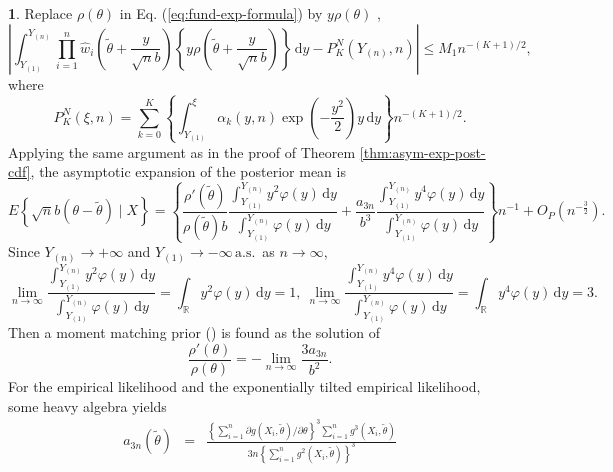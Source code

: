 \documentclass[oneside,english]{amsbook}
\numberwithin{section}{chapter}
\numberwithin{equation}{section}
\numberwithin{figure}{section}
\theoremstyle{plain}
\theoremstyle{plain}
\theoremstyle{definition}
\theoremstyle{plain}
\theoremstyle{plain}
\theoremstyle{remark}
\theoremstyle{definition}
\newtheorem{example}{\protect\examplename}
\theoremstyle{definition}
\newcommand{\diff}{\,\mathrm{d}}
\newcommand{\ascv}{\,\mathrm{a.s.}\,}
\providecommand{\examplename}{Example}
\begin{document}
\begin{example}
Replace $\rho\left(\theta\right)$ in Eq. (\ref{eq:fund-exp-formula})
by $y\rho\left(\theta\right)$ , 
\[
\left|\int_{Y_{\left(1\right)}}^{Y_{\left(n\right)}}\prod_{i=1}^{n}\hat{w}_{i}\left(\tilde{\theta}+\frac{y}{\sqrt{n}b}\right)\left\{ y\rho\left(\tilde{\theta}+\frac{y}{\sqrt{n}b}\right)\right\} \diff y-P_{K}^{N}\left(Y_{\left(n\right)},n\right)\right|\le M_{1}n^{-\left(K+1\right)/2},
\]
where 
\[
P_{K}^{N}\left(\xi,n\right)=\sum_{k=0}^{K}\left\{ \int_{Y_{\left(1\right)}}^{\xi}\alpha_{k}\left(y,n\right)\exp\left(-\frac{y^{2}}{2}\right)y\diff y\right\} n^{-\left(K+1\right)/2}.
\]
Applying the same argument as in the proof of Theorem \ref{thm:asym-exp-post-cdf},
the asymptotic expansion of the posterior mean is 
\[
E\left\{ \sqrt{n}b\left(\theta-\tilde{\theta}\right)\mid X\right\} =\left\{ \frac{\rho'\left(\tilde{\theta}\right)}{\rho\left(\tilde{\theta}\right)b}\frac{\int_{Y_{\left(1\right)}}^{Y_{\left(n\right)}}y^{2}\varphi\left(y\right)\diff y}{\int_{Y_{\left(1\right)}}^{Y_{\left(n\right)}}\varphi\left(y\right)\diff y}+\frac{a_{3n}}{b^{3}}\frac{\int_{Y_{\left(1\right)}}^{Y_{\left(n\right)}}y^{4}\varphi\left(y\right)\diff y}{\int_{Y_{\left(1\right)}}^{Y_{\left(n\right)}}\varphi\left(y\right)\diff y}\right\} n^{-1}+O_{P}\left(n^{-\frac{3}{2}}\right).
\]
Since $ Y_{\left( n \right )} \rightarrow + \infty $ and $ Y_{\left (1\right )} \rightarrow - \infty\ascv $ as $n\rightarrow\infty$,
\[
	\lim_{n\rightarrow\infty} \frac{\int_{Y_{\left(1\right)}}^{Y_{\left(n\right)}}y^{2}\varphi\left(y\right)\diff y}{\int_{Y_{\left(1\right)}}^{Y_{\left(n\right)}}\varphi\left(y\right)\diff y} = \int_{\mathbb{R}} y^2 \varphi \left(y\right) \diff y=1,\:
	\lim_{n\rightarrow\infty} \frac{\int_{Y_{\left(1\right)}}^{Y_{\left(n\right)}}y^{4}\varphi\left(y\right)\diff y}{\int_{Y_{\left(1\right)}}^{Y_{\left(n\right)}}\varphi\left(y\right)\diff y} = \int_{\mathbb{R}} y^4 \varphi \left(y\right) \diff y=3.
\]
Then a moment matching prior (\cite{ghosh2011moment}) is found as  the
solution of 
\[
\frac{\rho'\left(\theta\right)}{\rho\left(\theta\right)}=-\lim_{n\rightarrow\infty}\frac{3a_{3n}}{b^{2}}.
\]
 For the empirical likelihood and the 
exponentially tilted empirical likelihood, some heavy algebra yields
\begin{eqnarray*}
a_{3n}\left(\tilde{\theta}\right) & = & \frac{\left\{ \sum_{i=1}^{n}\partial g\left(X_{i},\tilde{\theta}\right)/\partial\theta\right\} ^{3}\sum_{i=1}^{n}g^{3}\left(X_{i},\tilde{\theta}\right)}{3n\left\{ \sum_{i=1}^{n}g^{2}\left(X_{i},\tilde{\theta}\right)\right\} ^{3}}\\

\end{eqnarray*}
\end{example}
\end{document}
